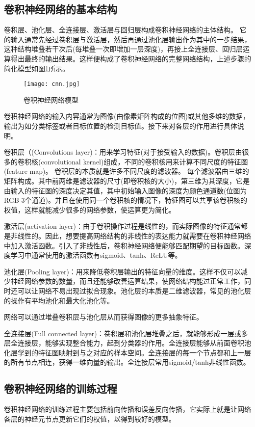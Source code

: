 \subsection{卷积神经网络的基本结构}

卷积层、池化层、全连接层、激活层与回归层构成卷积神经网络的主体结构。
它的输入通常先经过卷积层与激活层，然后再通过池化层输出作为其中的一步结果，这种结构堆叠若干次后(每堆叠一次即增加一层深度)，再接上全连接层、回归层运算得出最终的输出结果。这样便构成了卷积神经网络的完整网络结构，上述步骤的简化模型如图\ref{cnn}所示。

\begin{figure}
	\center
	{\texttt{[image: cnn.jpg]}}
	\caption{卷积神经网络模型}
	\label{cnn}
\end{figure}

卷积神经网络的输入内容通常为图像(由像素矩阵构成的位图)或其他多维的数据，输出为如分类标签或者目标位置的检测目标值。接下来对各层的作用进行具体说明。

卷积层（(Convolutions layer)：用来学习特征(对于接受输入的数据)。卷积层由很多的卷积核(convolutional kernel)组成，不同的卷积核用来计算不同尺度的特征图(feature map)。
卷积层的本质就是许多不同尺度的滤波器。
每个滤波器由三维的矩阵构成。其中前两维是滤波器的尺寸(即卷积核的大小)，第三维为其深度，它是由输入的特征图的深度决定其值，其中初始输入图像的深度为颜色通道数(位图为RGB-3个通道)。并且在使用同一个卷积核的情况下，特征图可以共享该卷积核的权值，这样就能减少很多的网络参数，使运算更为简化。

激活层(activation layer)：由于卷积操作过程是线性的，而实际图像的特征通常都是非线性的。因此，想要提高网络结构的非线性的表达能力就需要在卷积神经网络中加入激活函数。引入了非线性后，卷积神经网络便能够匹配期望的目标函数。深度学习中通常使用的激活函数有sigmoid、tanh、ReLU等。

池化层(Pooling layer)：用来降低卷积层输出的特征向量的维度。这样不仅可以减少神经网络参数的数量，而且还能够改善运算结果，使网络结构能过正常工作，同时还可以让网络不易出现过拟合现象。池化层的本质是二维滤波器，常见的池化层的操作有平均池化和最大化池化等。

网络可以通过堆叠卷积层与池化层从而获得图像的更多抽象特征。

全连接层(Full connected layer)：卷积层和池化层堆叠之后，就能够形成一层或多层全连接层，能够实现整合能力，起到分类器的作用。全连接层能够从前面卷积池化层学到的特征图映射到与之对应的样本空间。全连接层的每一个节点都和上一层的所有节点相连，获得一维向量的输出。全连接层常用sigmoid/tanh非线性函数。

\subsection{卷积神经网络的训练过程}
卷积神经网络的训练过程主要包括前向传播和误差反向传播，它实际上就是让网络各层的神经元节点更新它们的权值，以得到较好的模型。

